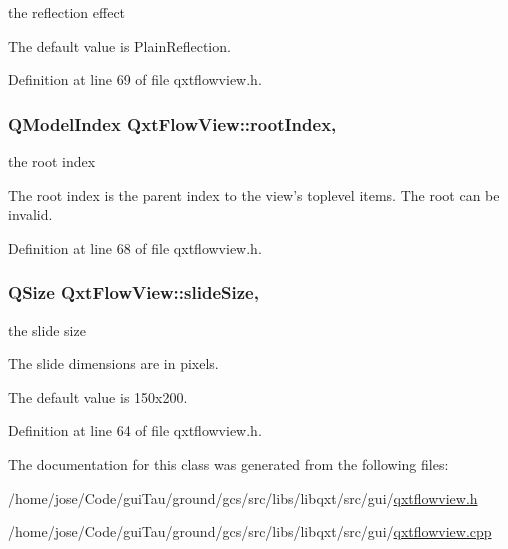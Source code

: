 the reflection effect 

The default value is Plain\-Reflection. 

Definition at line 69 of file qxtflowview.\-h.

\hypertarget{class_qxt_flow_view_a28518cd1681b38850bef799fb30e5fad}{
\subsubsection[{root\-Index}]{\setlength{\rightskip}{0pt plus 5cm}Q\-Model\-Index Qxt\-Flow\-View\-::root\-Index\hspace{0.3cm}{\ttfamily [read]}, {\ttfamily [write]}}}\label{class_qxt_flow_view_a28518cd1681b38850bef799fb30e5fad}


the root index 

The root index is the parent index to the view's toplevel items. The root can be invalid. 

Definition at line 68 of file qxtflowview.\-h.

\hypertarget{class_qxt_flow_view_ab0e7f4857f70488c32562f64a00979fd}{
\subsubsection[{slide\-Size}]{\setlength{\rightskip}{0pt plus 5cm}Q\-Size Qxt\-Flow\-View\-::slide\-Size\hspace{0.3cm}{\ttfamily [read]}, {\ttfamily [write]}}}\label{class_qxt_flow_view_ab0e7f4857f70488c32562f64a00979fd}


the slide size 

The slide dimensions are in pixels.

The default value is 150x200. 

Definition at line 64 of file qxtflowview.\-h.



The documentation for this class was generated from the following files\-:\begin{DoxyCompactItemize}
\item 
/home/jose/\-Code/gui\-Tau/ground/gcs/src/libs/libqxt/src/gui/\hyperlink{qxtflowview_8h}{qxtflowview.\-h}\item 
/home/jose/\-Code/gui\-Tau/ground/gcs/src/libs/libqxt/src/gui/\hyperlink{qxtflowview_8cpp}{qxtflowview.\-cpp}\end{DoxyCompactItemize}

